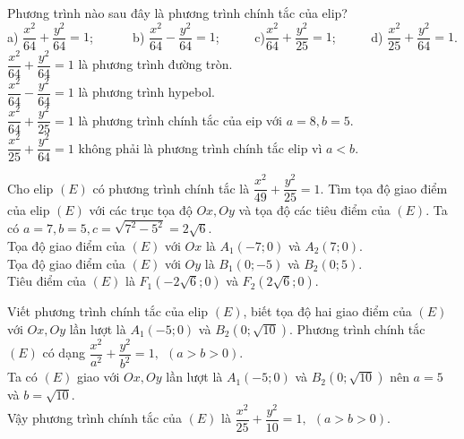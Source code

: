 \begin{bt}%
	Phương trình nào sau đây là phương trình chính tắc của elip?\\
	a) $\dfrac{x^2}{64}+\dfrac{y^2}{64}=1$; ~~~~~
	b) $\dfrac{x^2}{64}-\dfrac{y^2}{64}=1$;~~~~~
	c)$\dfrac{x^2}{64}+\dfrac{y^2}{25}=1$;~~~~~
	d) $\dfrac{x^2}{25}+\dfrac{y^2}{64}=1$.
	\loigiai 
	{	$\dfrac{x^2}{64}+\dfrac{y^2}{64}=1$ là phương trình đường tròn.\\
		$\dfrac{x^2}{64}-\dfrac{y^2}{64}=1$ là phương trình hypebol.\\
		$\dfrac{x^2}{64}+\dfrac{y^2}{25}=1$ là phương trình chính tắc của eip với $a=8, b=5$.\\
		$\dfrac{x^2}{25}+\dfrac{y^2}{64}=1$ không phải là phương trình chính tắc elip vì $a<b$.
	}
\end{bt}
\begin{bt}%
	Cho elip $(E)$ có phương trình chính tắc là $\dfrac{x^2}{49}+\dfrac{y^2}{25}=1$. Tìm tọa độ giao điểm của elip $(E)$ với các trục tọa độ $Ox, Oy$ và tọa độ các tiêu điểm của $(E)$.
	\loigiai 
	{
		Ta có $a=7, b=5, c=\sqrt{7^2-5^2}=2\sqrt{6}$.\\
		Tọa độ giao điểm của $(E)$ với $Ox$ là $A_1(-7;0)$ và $A_2(7;0)$.\\
		Tọa độ giao điểm của $(E)$ với $Oy$ là $B_1(0;-5)$ và $B_2(0;5)$.\\
		Tiêu điểm của $(E)$ là $F_1(-2\sqrt{6};0)$ và $F_2(2\sqrt{6};0)$.
	}
\end{bt}
\begin{bt}%
	Viết phương trình chính tắc của elip $(E)$, biết tọa độ hai giao điểm của $(E)$ với $Ox, Oy$ lần lượt là $A_1(-5;0)$ và $B_2(0;\sqrt{10})$.
	\loigiai 
	{
		Phương trình chính tắc $(E)$ có dạng $\dfrac{x^2}{a^2}+\dfrac{y^2}{b^2}=1, ~~(a>b>0)$.\\
		Ta có $(E)$ giao với $Ox, Oy$ lần lượt là $A_1(-5;0)$ và $B_2(0;\sqrt{10})$ nên $a=5$ và $b=\sqrt{10}$.\\
		Vậy phương trình chính tắc của $(E)$ là $\dfrac{x^2}{25}+\dfrac{y^2}{10}=1, ~~(a>b>0)$.
	}
\end{bt}
